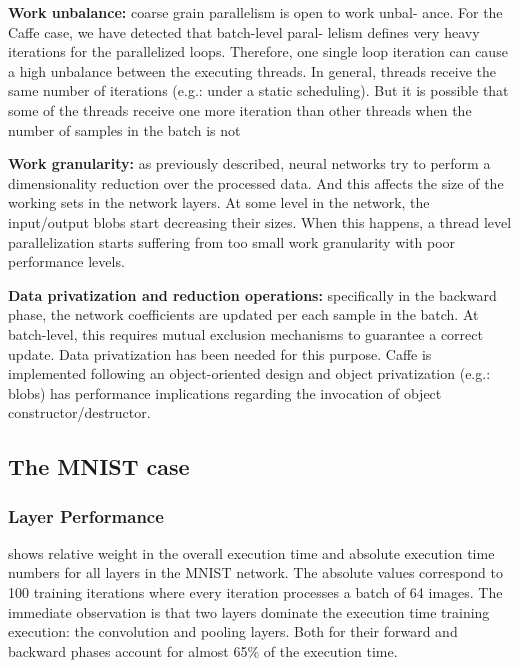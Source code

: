 \textbf{Work unbalance:} coarse grain parallelism is open to work unbal-
ance. For the Caffe case, we have detected that batch-level paral-
lelism defines very heavy iterations for the parallelized loops.
Therefore, one single loop iteration can cause a high unbalance
between the executing threads. In general, threads receive the
same number of iterations (e.g.: under a static scheduling). But it
is possible that some of the threads receive one more iteration
than other threads when the number of samples in the batch is not

\textbf{Work granularity:} as previously described, neural networks try
to perform a dimensionality reduction over the processed data.
And this affects the size of the working sets in the network layers.
At some level in the network, the input/output blobs start decreasing their sizes. When this happens, a thread level parallelization
starts suffering from too small work granularity with poor performance levels.

\textbf{Data privatization and reduction operations:} specifically in the
backward phase, the network coefficients are updated per each
sample in the batch. At batch-level, this requires mutual exclusion
mechanisms to guarantee a correct update. Data privatization has
been needed for this purpose. Caffe is implemented following an
object-oriented design and object privatization (e.g.: blobs) has
performance implications regarding the invocation of object constructor/destructor.

\subsection{The MNIST case}

\subsubsection{Layer Performance}
 shows relative weight in the overall execution time and absolute execution time numbers for all layers in the
MNIST network. The absolute values correspond to 100 training
iterations where every iteration processes a batch of 64 images.
The immediate observation is that two layers dominate the execution time training execution: the convolution and pooling layers.
Both for their forward and backward phases account for almost
65\% of the execution time.

